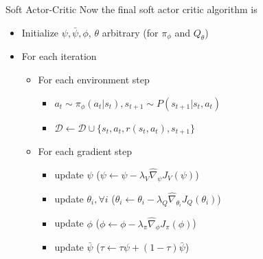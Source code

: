 \documentclass[8pt]{beamer}
\begin{document}
\begin{frame}{Soft Actor-Critic}
    Now the final soft actor critic algorithm is

    \begin{itemize}
        \item Initialize $\psi, \bar{\psi}, \phi$, $\theta$ arbitrary (for $\pi_\phi$ and $Q_\theta$)
        \item For each iteration
        \begin{itemize}
            \item For each environment step
            \begin{itemize}
                \item $a_t \sim \pi_\phi(a_t | s_t), s_{t+1} \sim P(s_{t+1}|s_t, a_t)$
                \item $\mathcal{D} \leftarrow \mathcal{D} \cup \{s_t, a_t, r(s_t, a_t), s_{t+1}\}$            
            \end{itemize}
            \item For each gradient step
            \begin{itemize}
                \item update $\psi$ (\( \psi \leftarrow \psi - \lambda_V \hat{\nabla}_\psi J_V (\psi) \))
                \item update $\theta_i, \forall i$ (\( \theta_i \leftarrow \theta_i - \lambda_Q \hat{\nabla}_{\theta_i} J_Q (\theta_i)\))
                \item update $\phi$ (\(\phi \leftarrow \phi - \lambda_\pi \hat{\nabla}_\phi J_\pi(\phi)\))
                \item update $\bar{\psi}$ ($\tau \leftarrow \tau \psi + (1- \tau)\bar{\psi}$)
            \end{itemize}
        \end{itemize}
    \end{itemize}
\end{frame}
\end{document}
